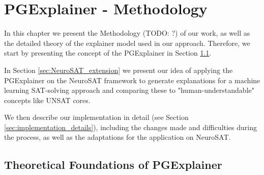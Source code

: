 \chapter{PGExplainer - Methodology}
\label{ch:PGExplainer}


In this chapter we present the Methodology (TODO: ?) of our work, as well as the detailed theory of the explainer model used in our approach. Therefore, we start by presenting the concept of the PGExplainer \cite{luo2020parameterized} in Section \ref{sec:TheoryPGE}.

In Section \ref{sec:NeuroSAT_extension} we present our idea of applying the PGExplainer on the NeuroSAT framework to generate explanations for a machine learning SAT-solving approach and comparing these to "human-understandable" concepts like UNSAT cores. 

We then describe our implementation in detail (see Section \ref{sec:implementation_details}), including the changes made and difficulties during the process, as well as the adaptations for the application on NeuroSAT.

\section{Theoretical Foundations of PGExplainer}
\label{sec:TheoryPGE}


